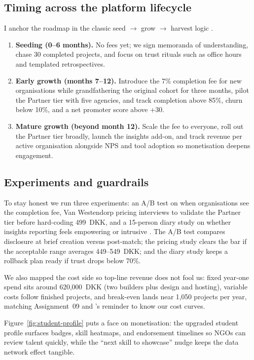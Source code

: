 \subsection*{Timing across the platform lifecycle}
I anchor the roadmap in the classic seed $\rightarrow$ grow $\rightarrow$ harvest logic \citep{Choudary2016}.
\begin{enumerate}
  \item \textbf{Seeding (0--6 months).} No fees yet; we sign memoranda of understanding, chase 30 completed projects, and focus on trust rituals such as office hours and templated retrospectives.
  \item \textbf{Early growth (months 7--12).} Introduce the 7\% completion fee for new organisations while grandfathering the original cohort for three months, pilot the Partner tier with five agencies, and track completion above 85\%, churn below 10\%, and a net promoter score above +30.
  \item \textbf{Mature growth (beyond month 12).} Scale the fee to everyone, roll out the Partner tier broadly, launch the insights add-on, and track revenue per active organisation alongside NPS and tool adoption so monetisation deepens engagement.
\end{enumerate}

\subsection*{Experiments and guardrails}
To stay honest we run three experiments: an A/B test on when organisations see the completion fee, Van Westendorp pricing interviews to validate the Partner tier before hard-coding 499~DKK, and a 15-person diary study on whether insights reporting feels empowering or intrusive \citep{Reillier2017}. The A/B test compares disclosure at brief creation versus post-match; the pricing study clears the bar if the acceptable range averages 449--549~DKK; and the diary study keeps a rollback plan ready if trust drops below 70\%.

We also mapped the cost side so top-line revenue does not fool us: fixed year-one spend sits around 620,000~DKK (two builders plus design and hosting), variable costs follow finished projects, and break-even lands near 1,050 projects per year, matching Assignment~09 and \citet{ShapiroVarian1999}'s reminder to know our cost curves.

Figure~\ref{fig:student-profile} puts a face on monetisation: the upgraded student profile surfaces badges, skill heatmaps, and endorsement timelines so NGOs can review talent quickly, while the ``next skill to showcase'' nudge keeps the data network effect tangible.


